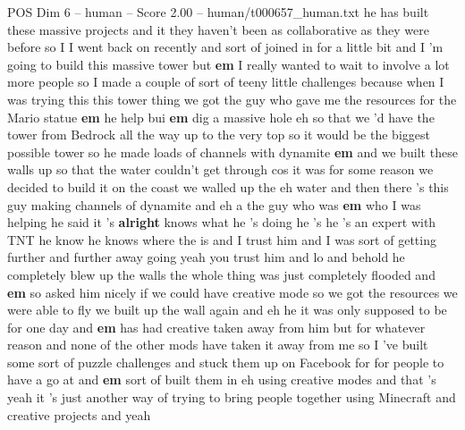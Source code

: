 \begin{textsample}{POS Dim 6 – human – Score 2.00 – human/t000657\_human.txt}  \label{ex:f6_pos_001}
he has built these massive projects and it they haven't been as collaborative as they were before so I I went back on recently and sort of joined in for a little bit and I 'm going to build this massive tower but \textbf{em} I really wanted to wait to involve a lot more people so I made a couple of sort of teeny little challenges because when I was trying this this tower thing we got the guy who gave me the resources for the Mario statue \textbf{em} he help bui \textbf{em} dig a massive hole eh so that we 'd have the tower from Bedrock all the way up to the very top so it would be the biggest possible tower so he made loads of channels with dynamite \textbf{em} and we built these walls up so that the water couldn't get through cos it was for some reason we decided to build it on the coast we walled up the eh water and then there 's this guy making channels of dynamite and eh a the guy who was \textbf{em} who I was helping he said it 's \textbf{alright} knows what he 's doing he 's he 's an expert with TNT he know he knows where the is and I trust him and I was sort of getting further and further away going yeah you trust him and lo and behold he completely blew up the walls the whole thing was just completely flooded and \textbf{em} so asked him nicely if we could have creative mode so we got the resources we were able to fly we built up the wall again and eh he it was only supposed to be for one day and \textbf{em} has had creative taken away from him but for whatever reason and none of the other mods have taken it away from me so I 've built some sort of puzzle challenges and stuck them up on Facebook for for people to have a go at and \textbf{em} sort of built them in eh using creative modes and that 's yeah it 's just another way of trying to bring people together using Minecraft and creative projects and yeah

\end{textsample}

